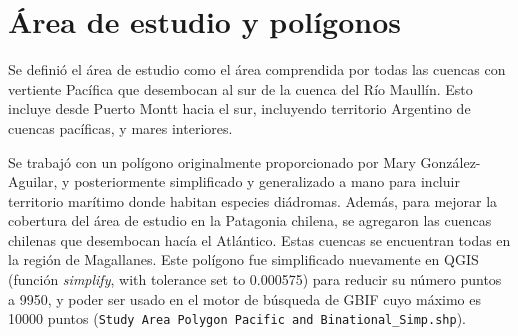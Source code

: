\documentclass[sn-apa,pdflatex]{sn-jnl}
\begin{document}
\section{Área de estudio y
polígonos}\label{uxe1rea-de-estudio-y-poluxedgonos}

Se definió el área de estudio como el área comprendida por todas las
cuencas con vertiente Pacífica que desembocan al sur de la cuenca del
Río Maullín. Esto incluye desde Puerto Montt hacia el sur, incluyendo
territorio Argentino de cuencas pacíficas, y mares interiores.

Se trabajó con un polígono originalmente proporcionado por Mary
González-Aguilar, y posteriormente simplificado y generalizado a mano
para incluir territorio marítimo donde habitan especies diádromas.
Además, para mejorar la cobertura del área de estudio en la Patagonia
chilena, se agregaron las cuencas chilenas que desembocan hacía el
Atlántico. Estas cuencas se encuentran todas en la región de Magallanes.
Este polígono fue simplificado nuevamente en QGIS (función
\emph{simplify}, with tolerance set to 0.000575) para reducir su número
puntos a 9950, y poder ser usado en el motor de búsqueda de GBIF cuyo
máximo es 10000 puntos
(\texttt{Study\ Area\ Polygon\ Pacific\ and\ Binational\_Simp.shp}).
\end{document}
